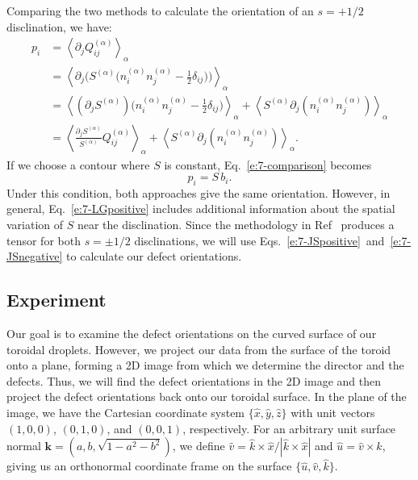 Comparing the two methods to calculate the orientation of an $s = +1/2$ disclination, we have:
\begin{align}
 p_i &= \left \langle \partial_j Q_{ij}^{(\alpha)} \right \rangle_{\alpha} \nonumber \\
  &= \left \langle \partial_j \bigg(S^{(\alpha)}\bigg(n_{i}^{(\alpha)}n_{j}^{(\alpha)} - \frac{1}{2}\delta_{ij}\bigg)\bigg) \right \rangle_{\alpha} \nonumber \\
  &= \left \langle (\partial_j S^{(\alpha)}) \bigg(n_{i}^{(\alpha)}n_{j}^{(\alpha)} - \frac{1}{2}\delta_{ij}\bigg) \right \rangle_{\alpha}
      + \left \langle S^{(\alpha)} \partial_j (n_{i}^{(\alpha)}n_{j}^{(\alpha)}) \right \rangle_{\alpha} \nonumber \\
  &= \left \langle \frac{\partial_j S^{(\alpha)}}{S^{(\alpha)}} Q_{ij}^{(\alpha)}\right \rangle_{\alpha}
      + \left \langle S^{(\alpha)} \partial_j (n_{i}^{(\alpha)}n_{j}^{(\alpha)}) \right \rangle_{\alpha}\label{e:7-comparison}.
\end{align}
If we choose a contour where $S$ is constant, Eq.~\ref{e:7-comparison} becomes
\begin{equation}
  p_i = S \, b_i.
\end{equation}
Under this condition, both approaches give the same orientation.
However, in general, Eq.~\ref{e:7-LGpositive} includes additional information about the spatial variation of $S$ near the disclination.
Since the methodology in Ref~\cite{jsel} produces a tensor for both $s = \pm 1/2$ disclinations, we will use Eqs.~\ref{e:7-JSpositive}~and~\ref{e:7-JSnegative} to calculate our defect orientations.


\subsection{Experiment}
Our goal is to examine the defect orientations on the curved surface of our toroidal droplets.
However, we project our data from the surface of the toroid onto a plane, forming a 2D image from which we determine the director and the defects.
Thus, we will find the defect orientations in the 2D image and then project the defect orientations back onto our toroidal surface.
In the plane of the image, we have the Cartesian coordinate system $\{ \hat{x},\hat{y},\hat{z} \}$ with unit vectors $(1,0,0)$, $(0,1,0)$, and $(0,0,1)$, respectively.
For an arbitrary unit surface normal $\mathbf{k} = (a, b, \sqrt{1-a^2-b^2})$, we define $\hat{v} = \hat{k} \times \hat{x}/|\hat{k} \times \hat{x}|$ and $\hat{u} = \hat{v} \times \hat{k}$, giving us an orthonormal coordinate frame on the surface $\{\hat{u},\hat{v},\hat{k} \}$.


